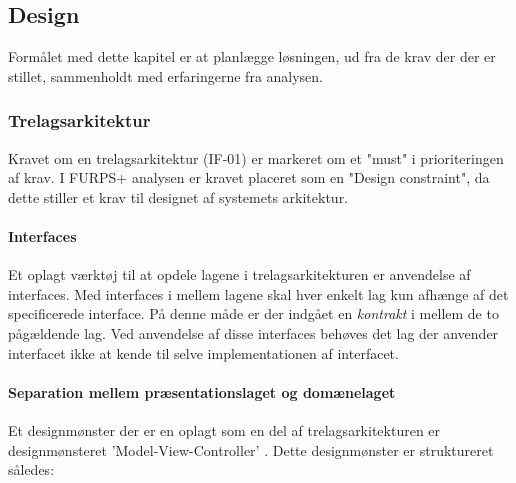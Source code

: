 \subsection{Design}

Formålet med dette kapitel er at planlægge løsningen, ud fra de krav der der er
stillet, sammenholdt med erfaringerne fra analysen.


\subsubsection{Trelagsarkitektur}%
\label{ssub:3_lags_arkiteturen}

Kravet om en trelagsarkitektur (IF-01) er markeret om et "must" i prioriteringen af
krav. I FURPS+ analysen er kravet placeret som en "Design constraint", da dette
stiller et krav til designet af systemets arkitektur. 


\paragraph{Interfaces} Et oplagt værktøj til at opdele lagene i
trelagsarkitekturen er anvendelse af interfaces. Med interfaces i mellem lagene 
skal hver enkelt lag kun afhænge af det specificerede interface. På denne måde
er der indgået en \emph{kontrakt} i mellem de to pågældende lag.
Ved anvendelse af disse interfaces behøves det lag der anvender interfacet ikke
at kende til selve implementationen af interfacet.

\paragraph{Separation mellem præsentationslaget og domænelaget}

Et designmønster der er en oplagt som en del af trelagsarkitekturen er
designmønsteret 'Model-View-Controller'\cite[p. 176]{} . Dette designmønster er struktureret
således:

